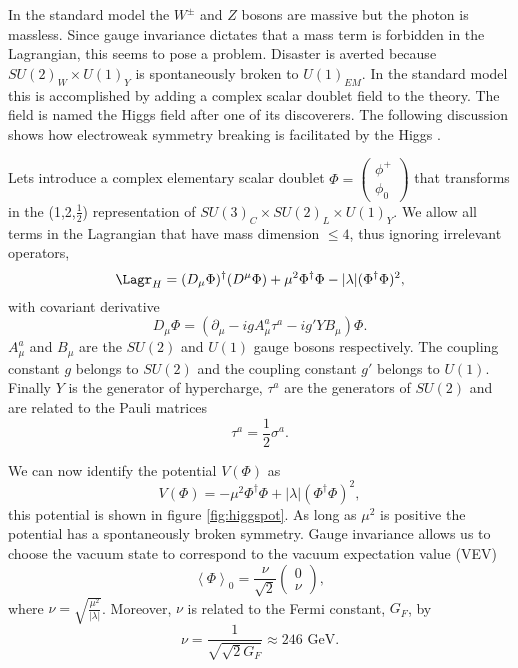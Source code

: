 
In the standard model the $W^{\pm}$ and $Z$ bosons are massive but the photon is massless.
Since gauge invariance dictates that a mass term is forbidden in the Lagrangian, this seems to pose a problem.
Disaster is averted because $SU(2)_W \times U(1)_Y$ is spontaneously broken to $U(1)_{EM}$.
In the standard model this is accomplished by adding a complex scalar doublet field to the theory.
The field is named the Higgs field after one of its discoverers.
The following discussion shows how electroweak symmetry breaking is facilitated by the Higgs \cite{Quigg:ds52, Quigg:ds53, peskin:book}.

Lets introduce a complex elementary scalar doublet $\Phi=\left(\begin{matrix}\phi^+\\\phi_0\end{matrix}\right)$ that transforms in the (1,2,$\frac{1}{2}$) representation of $SU(3)_C\times SU(2)_L\times U(1)_Y$.
We allow all terms in the Lagrangian that have mass dimension $\leq 4$, thus ignoring irrelevant operators,
\begin{equation}
  \Lagr_H=(D_\mu\Phi)^\dagger(D^\mu\Phi)+\mu^2\Phi^\dagger\Phi-|\lambda|(\Phi^\dagger\Phi)^2,
\end{equation}
with covariant derivative
\begin{equation}
  D_\mu\Phi=(\partial_\mu-igA^a_\mu\tau^a-ig'YB_\mu)\Phi.
\end{equation}
$A^a_\mu$ and $B_\mu$ are the $SU(2)$ and $U(1)$ gauge bosons respectively.
The coupling constant $g$ belongs to $SU(2)$ and the coupling constant $g'$ belongs to $U(1)$.
Finally $Y$ is the generator of hypercharge, $\tau^a$ are the generators of $SU(2)$ and are related to the Pauli matrices
\begin{equation}
  \tau^a=\frac{1}{2}\sigma^a.
\end{equation}

We can now identify the potential $V(\Phi)$ as
\begin{equation}
  V(\Phi)=-\mu^2\Phi^\dagger\Phi+|\lambda|(\Phi^\dagger\Phi)^2,
\end{equation}
this potential is shown in figure \ref{fig:higgspot}.
As long as $\mu^2$ is positive the potential has a spontaneously broken symmetry.
Gauge invariance allows us to choose the vacuum state to correspond to the vacuum expectation value (VEV)
\begin{equation}
  \left<\Phi\right>_0=\frac{\nu}{\sqrt{2}}\left(\begin{matrix}0 \\ \nu\end{matrix}\right),
\end{equation}
where $\nu=\sqrt{\frac{\mu^2}{|\lambda|}}$.
Moreover, $\nu$ is related to the Fermi constant, $G_F$, by
\begin{equation}
  \nu=\frac{1}{\sqrt{\sqrt{2}G_F}}\approx 246 \mbox{ GeV}.
\end{equation}

